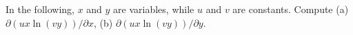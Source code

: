 In the following, $x$ and $y$ are variables, while $u$ and $v$ are
constants. Compute (a) $\partial(ux\ln (vy))/\partial x$, (b) $\partial(ux\ln (vy))/\partial y$.\answercheck
